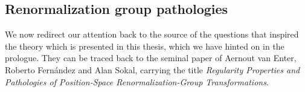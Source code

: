 \documentclass[12pt]{article}
\newcommand{\1}{\mathbbm{1}}
\newcommand{\5}{\vspace{0.5cm}}
\theoremstyle{definition}
\begin{document}

\subsection{Renormalization group pathologies}

We now redirect our attention back to the source of the questions that inspired the theory which is presented in this thesis, which we have hinted on in the prologue. They can be traced back to the seminal paper of Aernout van Enter, Roberto Fern\'andez and Alan Sokal, carrying the title \textit{Regularity Properties and Pathologies of Position-Space Renormalization-Group Transformations}. \\
\end{document}

